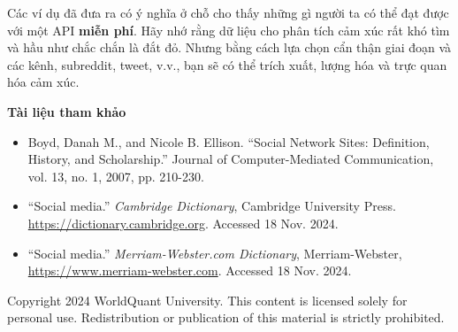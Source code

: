 Các ví dụ đã đưa ra có ý nghĩa ở chỗ cho thấy những gì người ta có thể đạt được với một API \textbf{miễn phí}. Hãy nhớ rằng dữ liệu cho phân tích cảm xúc rất khó tìm và hầu như chắc chắn là đắt đỏ. Nhưng bằng cách lựa chọn cẩn thận giai đoạn và các kênh, subreddit, tweet, v.v., bạn sẽ có thể trích xuất, lượng hóa và trực quan hóa cảm xúc.

\textbf{Tài liệu tham khảo}

\begin{itemize}
  \item Boyd, Danah M., and Nicole B. Ellison. ``Social Network Sites: Definition, History, and Scholarship.'' Journal of Computer-Mediated Communication, vol. 13, no. 1, 2007, pp. 210-230.

  \item ``Social media.'' \emph{Cambridge Dictionary}, Cambridge University Press. \url{https://dictionary.cambridge.org}. Accessed 18 Nov. 2024.

  \item ``Social media.'' \emph{Merriam-Webster.com Dictionary}, Merriam-Webster, \url{https://www.merriam-webster.com}. Accessed 18 Nov. 2024.
\end{itemize}

\begin{center}\small
Copyright 2024 WorldQuant University. This content is licensed solely for personal use. Redistribution or publication of this material is strictly prohibited.
\end{center}

